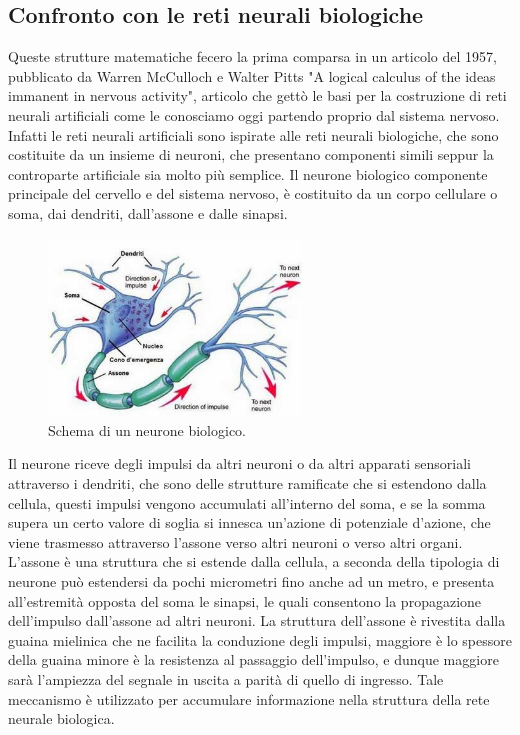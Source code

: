 \subsection{Confronto con le reti neurali biologiche}

Queste strutture matematiche fecero la prima comparsa in un articolo del 1957, pubblicato da Warren McCulloch e Walter Pitts
"A logical calculus of the ideas immanent in nervous activity", articolo che gettò le basi per la costruzione di reti neurali artificiali
come le conosciamo oggi partendo proprio dal sistema nervoso.
Infatti le reti neurali artificiali sono ispirate alle reti neurali biologiche, che sono costituite da un insieme di neuroni,
che presentano componenti simili seppur la controparte artificiale sia molto più semplice.
Il neurone biologico componente principale del cervello e del sistema nervoso, è costituito da un corpo cellulare o soma, dai dendriti, 
dall'assone e dalle sinapsi.

    \begin{figure}[H]
        \centering
        \includegraphics[width=0.6\textwidth]{imgs/neurone.jpg}
        \caption{Schema di un neurone biologico.}
        \label{fig:neuron_bio}
    \end{figure}

Il neurone riceve degli impulsi da altri neuroni o da altri apparati sensoriali attraverso i dendriti, che sono delle strutture ramificate
che si estendono dalla cellula, questi impulsi vengono accumulati all'interno del soma, e se la somma supera un certo valore di soglia
si innesca un'azione di potenziale d'azione, che viene trasmesso attraverso l'assone verso altri neuroni o verso altri organi.
L'assone è una struttura che si estende dalla cellula, a seconda della tipologia di neurone può estendersi da pochi micrometri fino anche ad un metro,
e presenta all'estremità opposta del soma le sinapsi, le quali consentono la propagazione dell'impulso dall'assone ad altri neuroni.
La struttura dell'assone è rivestita dalla guaina mielinica che ne facilita la conduzione degli impulsi, maggiore è lo spessore della guaina
minore è la resistenza al passaggio dell'impulso, e dunque maggiore sarà l'ampiezza del segnale in uscita a parità di quello di ingresso. 
Tale meccanismo è utilizzato per accumulare informazione nella struttura della rete neurale biologica.

